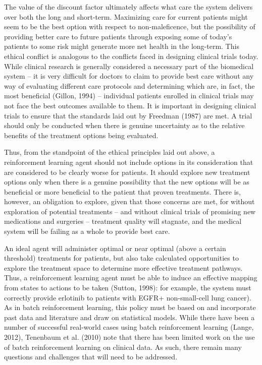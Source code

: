 \documentclass[]{spie}  %
\begin{document}
The value of the discount factor ultimately affects what care the system delivers over both the long and short-term. Maximizing care for current patients might seem to be the best option with respect to non-maleficence, but the possibility of providing better care to future patients through exposing some of today’s patients to some risk might generate more net health in the long-term. This ethical conflict is analogous to the conflicts faced in designing clinical trials today. While clinical research is generally considered a necessary part of the biomedical system – it is very difficult for doctors to claim to provide best care without any way of evaluating different care protocols and determining which are, in fact, the most beneficial (Gillon, 1994) – individual patients enrolled in clinical trials may not face the best outcomes available to them. It is important in designing clinical trials to ensure that the standards laid out by Freedman (1987) are met. A trial should only be conducted when there is genuine uncertainty as to the relative benefits of the treatment options being evaluated.

Thus, from the standpoint of the ethical principles laid out above, a reinforcement learning agent should not include options in its consideration that are considered to be clearly worse for patients. It should explore new treatment options only when there is a genuine possibility that the new options will be as beneficial or more beneficial to the patient that proven treatments. There is, however, an obligation to explore, given that those concerns are met, for without exploration of potential treatments – and without clinical trials of promising new medications and surgeries – treatment quality will stagnate, and the medical system will be failing as a whole to provide best care.

An ideal agent will administer optimal or near optimal (above a certain threshold) treatments for patients, but also take calculated opportunities to explore the treatment space to determine more effective treatment pathways. Thus, a reinforcement learning agent must be able to induce an effective mapping from states to actions to be taken (Sutton, 1998): for example, the system must correctly provide erlotinib to patients with EGFR+ non-small-cell lung cancer). As in batch reinforcement learning, this policy must be based on and incorporate past data and literature and draw on statistical models. While there have been a number of successful real-world cases using batch reinforcement learning (Lange, 2012), Tenenbaum et al. (2010) note that there has been limited work on the use of batch reinforcement learning on clinical data. As such, there remain many questions and challenges that will need to be addressed.
\end{document}
